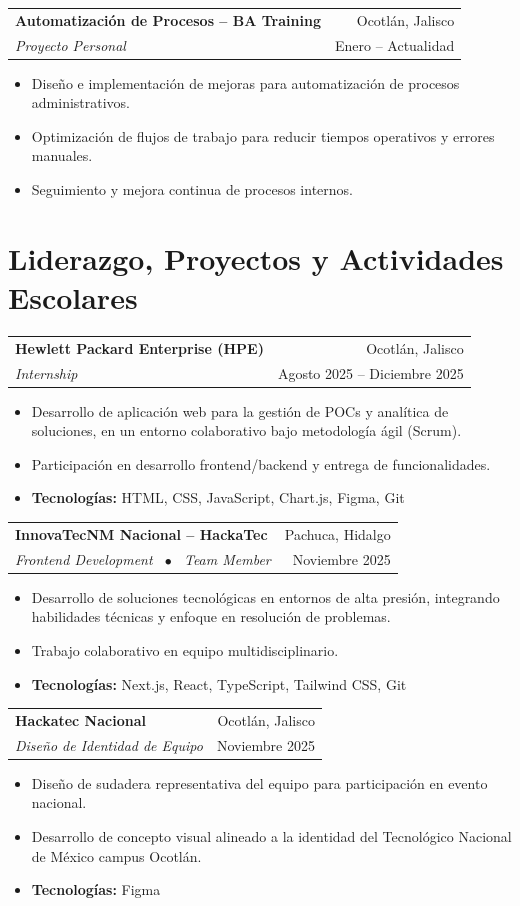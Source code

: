 \documentclass[10pt,letterpaper]{article}
\makeatletter
\newcommand{\resumeEntry}[4]{
  \vspace{3pt}
  \noindent
  \begin{tabular*}{\textwidth}[t]{l@{\extracolsep{\fill}}r}
    \textbf{#1} & \small\color{secondary}#2 \\
    \textit{#3} & \small\color{secondary}#4 \\
  \end{tabular*}
  \vspace{-3pt}
}
\makeatother
\begin{document}
\resumeEntry{Automatización de Procesos -- BA Training}{Ocotlán, Jalisco}{Proyecto Personal}{Enero -- Actualidad}
\begin{itemize}[leftmargin=12pt, noitemsep, topsep=1pt]
  \item Diseño e implementación de mejoras para automatización de procesos administrativos.
  \item Optimización de flujos de trabajo para reducir tiempos operativos y errores manuales.
  \item Seguimiento y mejora continua de procesos internos.
\end{itemize}

\section{Liderazgo, Proyectos y Actividades Escolares}

\resumeEntry{Hewlett Packard Enterprise (HPE)}{Ocotlán, Jalisco}{Internship}{Agosto 2025 -- Diciembre 2025}
\begin{itemize}[leftmargin=12pt, noitemsep, topsep=1pt]
  \item Desarrollo de aplicación web para la gestión de POCs y analítica de soluciones, en un entorno colaborativo bajo metodología ágil (Scrum).
  \item Participación en desarrollo frontend/backend y entrega de funcionalidades.
  \item \textbf{Tecnologías:} HTML, CSS, JavaScript, Chart.js, Figma, Git
\end{itemize}

\resumeEntry{InnovaTecNM Nacional -- HackaTec}{Pachuca, Hidalgo}{Frontend Development \ $\bullet$ \ Team Member}{Noviembre 2025}
\begin{itemize}[leftmargin=12pt, noitemsep, topsep=1pt]
  \item Desarrollo de soluciones tecnológicas en entornos de alta presión, integrando habilidades técnicas y enfoque en resolución de problemas.
  \item Trabajo colaborativo en equipo multidisciplinario.
  \item \textbf{Tecnologías:} Next.js, React, TypeScript, Tailwind CSS, Git
\end{itemize}

\resumeEntry{Hackatec Nacional}{Ocotlán, Jalisco}{Diseño de Identidad de Equipo}{Noviembre 2025}
\begin{itemize}[leftmargin=12pt, noitemsep, topsep=1pt]
  \item Diseño de sudadera representativa del equipo para participación en evento nacional.
  \item Desarrollo de concepto visual alineado a la identidad del Tecnológico Nacional de México campus Ocotlán.
  \item \textbf{Tecnologías:} Figma
\end{itemize}
\end{document}
